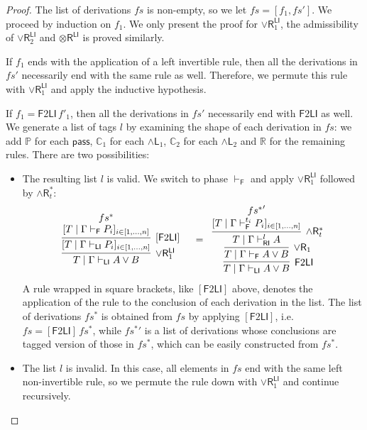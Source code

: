 \documentclass[submission,copyright,creativecommons]{eptcs}
\theoremstyle{definition}
\newcommand{\tr}{\otimes \mathsf{R}}
\newcommand{\pass}{\mathsf{pass}}
\newcommand{\andlone}{\land \mathsf{L}_{1}}
\newcommand{\andltwo}{\land \mathsf{L}_{2}}
\newcommand{\andr}{\land \mathsf{R}}
\newcommand{\orrone}{\lor \mathsf{R}_{1}}
\newcommand{\orrtwo}{\lor \mathsf{R}_{2}}
\newcommand{\RI}{\mathsf{RI}}
\newcommand{\LI}{\mathsf{LI}}
\newcommand{\F}{\mathsf{F}}
\newcommand{\tP}{\mathbb{P}}
\newcommand{\tCone}{\mathbb{C}_1}
\newcommand{\tCtwo}{\mathbb{C}_2}
\newcommand{\tE}{\mathbb{R}}
\newcommand{\proofbox}[1]{\begin{tabular}{l} #1 \end{tabular}}
\begin{document}
\begin{proof}
  The list of derivations $fs$ is non-empty, so we let $fs = [f_1 , fs']$.
  We proceed by induction on $f_1$.
  We only present the proof for $\orrone^{\LI}$, the admissibility of $\orrtwo^{\LI}$ and $\tr^{\LI}$ is proved similarly.
  
  If $f_1$ ends with the application of a left invertible rule, then all the derivations in $fs'$ necessarily end with the same rule as well.
  Therefore, we permute this rule with $\orrone^{\LI}$ and apply the inductive hypothesis.

  If $f_1 = \F 2 \LI \,f'_1$, then all the derivations in $fs'$ necessarily end with $\F 2 \LI$ as well. 
    We generate a list of tags $l$ by examining the shape of each derivation in $fs$: we add $\tP$ for each $\pass$, $\tCone$ for each $\andlone$, $\tCtwo$ for each $\andltwo$ and $\tE$ for the remaining rules.
    There are two possibilities:
    \begin{itemize}
      \item The resulting list $l$ is valid. We switch to phase $\vdash_\F$ and apply  $\orrone^{\LI}$ followed by $\andr^{*}_{t}$:
      \begin{displaymath}
        \begin{array}{cc}
          \proofbox{
          \infer[\orrone^{\LI}]{T \mid \Gamma \vdash_{\LI} A \lor B}{
            \infer[ {[\F 2 \LI]} ]{[T \mid \Gamma \vdash_{\LI} P_i]_{i \in [1 , \dots , n]}}{
              \deduce{[T \mid \Gamma \vdash_{\F} P_i]_{i \in [1 , \dots , n]}}{fs^{*}}
            }
          }
          }
          &
          =
          \proofbox{
          \infer[\F 2 \LI]{T \mid \Gamma \vdash_{\LI} A \lor B}{
            \infer[\orrone]{T \mid \Gamma \vdash_{\F} A \lor B}{
              \infer[\andr^{*}_t]{T \mid \Gamma \vdash^{l}_{\RI} A}{
                \deduce{[T \mid \Gamma \vdash^{t_i}_{\F} P_i]_{i \in [1 , \dots , n]}}{{fs^{*}}'}
              }
            }
          }
        }
        \end{array}
      \end{displaymath}
      A rule wrapped in square brackets, like $[\F 2 \LI]$ above, denotes the application of the rule to the conclusion of each derivation in the list.
      The list of derivations $fs^{*}$ is obtained from $fs$ by applying $[\F 2 \LI]$, i.e. $fs = [\F 2 \LI]\,fs^*$, while ${fs^*}'$ is a list of derivations whose conclusions are tagged version of those in $fs^{*}$, which can be easily constructed from $fs^{*}$.
      \item The list $l$ is invalid. In this case, all elements in $fs$ end with the same left non-invertible rule, so we permute the rule down with $\orrone^{\LI}$ and continue recursively.

\end{itemize}
\end{proof}
\end{document}
